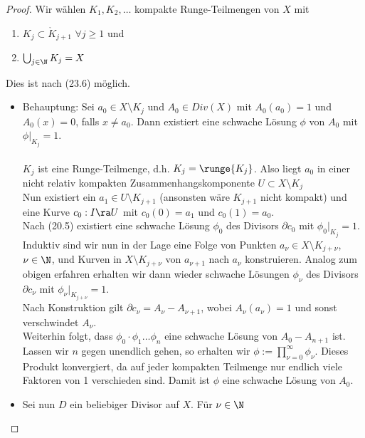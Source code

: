 \begin{proof}
  Wir wählen $K_1, K_2, \dots$ kompakte Runge-Teilmengen von $X$ mit
  \begin{enumerate}
  \item $K_j \subset \mathring{K}_{j+1}$ $\forall j \geq 1$ und
  \item $\bigcup_{j \in \N} K_j = X$
  \end{enumerate}
  Dies ist nach (23.6) möglich.
  \begin{itemize}
  \item Behauptung: Sei $a_0 \in X \setminus K_j$ und $A_0 \in Div(X)$
    mit $A_0(a_0) = 1$ und $A_0(x) = 0$, falls $x \neq a_0$. Dann
    existiert eine schwache Lösung $\phi$ von $A_0$ mit $\phi |_{K_j}
    = 1$. \\
    \\
    $K_j$ ist eine Runge-Teilmenge, d.h. $K_j = \runge{K_j}$. Also
    liegt $a_0$ in einer nicht relativ kompakten
    Zusammenhangskomponente $U \subset X \setminus K_j$ \\
    Nun existiert ein $a_1 \in U \setminus K_{j+1}$ (ansonsten wäre
    $K_{j+1}$ nicht kompakt) und eine Kurve $c_0: I \ra U$ mit $c_0(0)
  =a_1$ und $c_0(1) = a_0$. \\
  Nach (20.5) existiert eine schwache Lösung $\phi_0$ des Divisors
  $\partial c_0$ mit $\phi_0|_{K_j} = 1$. \\
  Induktiv sind wir nun in der Lage eine Folge von Punkten $a_\nu \in
  X \setminus K_{j+ \nu}$, $\nu \in \N$, und Kurven in $X \setminus
  K_{j+\nu}$ von $a_{\nu+1}$ nach $a_\nu$ konstruieren. Analog zum
  obigen erfahren erhalten wir dann wieder schwache Lösungen
  $\phi_\nu$ des Divisors $\partial c_\nu$ mit $\phi_\nu |_{K_{j+\nu}}
  = 1$. \\
  Nach Konstruktion gilt $\partial c_\nu = A_\nu - A_{\nu+1}$, wobei
  $A_\nu(a_\nu) = 1$ und sonst verschwindet $A_\nu$. \\
  Weiterhin folgt, dass $\phi_0 \cdot \phi_1 \dots \phi_n$ eine
  schwache Lösung von $A_0 - A_{n+1}$ ist.
  Lassen wir $n$ gegen unendlich gehen, so erhalten wir $\phi :=
  \prod_{\nu = 0}^\infty \phi_\nu$. Dieses Produkt konvergiert, da
  auf jeder kompakten Teilmenge nur endlich viele Faktoren von 1
  verschieden sind.
  Damit ist $\phi$ eine schwache Lösung von $A_0$.
\item Sei nun $D$ ein beliebiger Divisor auf $X$. Für $\nu \in \N$

\end{itemize}
\end{proof}
